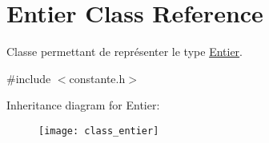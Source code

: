 \hypertarget{class_entier}{\section{Entier Class Reference}
\label{class_entier}
}


Classe permettant de représenter le type \hyperlink{class_entier}{Entier}.  




{\ttfamily \#include $<$constante.\-h$>$}

Inheritance diagram for Entier\-:\begin{figure}[H]
\begin{center}
\leavevmode
\texttt{[image: class\_entier]}
\end{center}
\end{figure}
